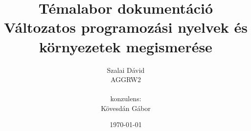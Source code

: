 



	
	\title{Témalabor dokumentáció \\ Változatos programozási nyelvek és környezetek megismerése }
	\author{Szalai Dávid \\ AGGRW2 \\ \\ konzulens: \\ Kövesdán Gábor}
	\date{\today}
	
	\maketitle
	
	\tableofcontents
	
	\clearpage
	
	
	
	
	
	
